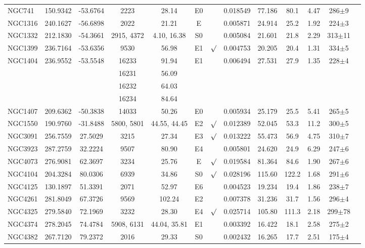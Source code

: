 \documentclass[apjl]{emulateapj}
\begin{document}
\begin{table}
\begin{tabular}{lcccccccccccc}
NGC741  & 150.9342 & -53.6764 & 2223 & 28.14 & E0 &         & 0.018549 & 77.186 & 80.1 & 4.47 & 286$\pm$9 \\
NGC1316 & 240.1627 & -56.6898 & 2022  & 21.21  & E &         & 0.005871 & 24.914 & 25.2  & 1.92 & 224$\pm$3\\
NGC1332 & 212.1830 & -54.3661 & 2915, 4372  & 4.10, 16.38  & S0  &         & 0.005084 & 21.601 & 21.8  & 2.29 & 313$\pm$11 \\
NGC1399 & 236.7164 & -53.6356 & 9530  & 56.98    & E1   & $\surd$ & 0.004753 & 20.205 & 20.4  &  1.31 & 334$\pm$5\\
NGC1404 & 236.9552 & -53.5548 & 16233 & 91.94  & E1  & & 0.006494 & 27.531 & 27.9  & 1.35 & 228$\pm$4 \\
        & && 16231 & 56.09 &\\
        & && 16232 & 64.03 &\\
        & && 16234 & 84.64 &\\
NGC1407 & 209.6362 & -50.3838 & 14033 & 50.26    & E0   &         & 0.005934 & 25.179 & 25.5  &  5.41 & 265$\pm$5 \\
NGC1550 & 190.9760 & -31.8488 & 5800, 5801 & 44.55, 44.45 & E2   & $\surd$ & 0.012389 & 52.045 & 53.3 & 11.2  & 300$\pm$5 \\
NGC3091 & 256.7559 & 27.5029 & 3215 & 27.34 & E3 & $\surd$ & 0.013222 & 55.473 & 56.9 & 4.75 & 310$\pm$7 \\
NGC3923 & 287.2759 & 32.2224  & 9507  & 80.90  & E4  &         & 0.005801 & 24.620 & 24.9 & 6.29 & 247$\pm$6 \\
NGC4073 & 276.9081 & 62.3697 & 3234 & 25.76 & E  & $\surd$ & 0.019584 & 81.364 & 84.6 & 1.90 & 267$\pm$6 \\
NGC4104 & 204.3284 & 80.0306 &  6939 & 34.86    & S0  & $\surd$ & 0.028196 & 115.60  & 122.2 &  1.68 & 291$\pm$6 \\
NGC4125 & 130.1897 & 51.3391  & 2071   & 52.97 & E6  &         & 0.004523 & 19.234 & 19.4 & 1.86 & 238$\pm$7 \\
NGC4261 & 281.8049 & 67.3726 &  9569 & 102.24   & E2 &         & 0.007378 & 31.236 & 31.7  &  1.56 & 296$\pm$4 \\
NGC4325 & 279.5840 & 72.1969 & 3232 & 28.30 & E4 & $\surd$ & 0.025714 & 105.80 & 111.3 & 2.18 & 299$\pm$78 \\
NGC4374 & 278.2045 & 74.4784  & 5908, 6131 & 44.04, 35.81  & E1 &           & 0.003392 & 16.422 & 18.1 & 2.58 & 275$\pm$2 \\
NGC4382 & 267.7120 & 79.2372  & 2016 & 29.33  & S0 &          & 0.002432 & 16.265 & 17.7 & 2.51 & 175$\pm$4  \\

\end{tabular}
\end{table}
\end{document}
